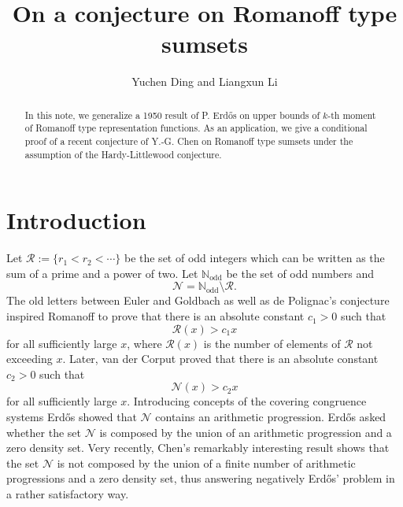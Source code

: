 \documentclass[12pt,a4paper,reqno]{amsart}
\numberwithin{equation}{section}
\theoremstyle{plain}
\theoremstyle{definition}
\begin{document}
\title
[On a conjecture on Romanoff type sumsets]
{On a conjecture on Romanoff type sumsets}

\author
[Y. Ding and L. Li] {Yuchen Ding and Liangxun Li}
\address{(Yuchen Ding$^{1,2}$) $^1$School of Mathematics,  Yangzhou University, Yangzhou 225002, People's Republic of China}
\address{$^2$HUN-REN Alfr\'ed R\'enyi Institute of Mathematics, Budapest, Pf. 127, H-1364 Hungary}


\address{(Liangxun Li$^{1,2}$) $^1$Mathematical Research Center, Shandong University, Jinan, Shandong 250100, People's Republic of China}
\address{$^2$HUN-REN Alfr\'ed R\'enyi Institute of Mathematics, Budapest, Pf. 127, H-1364 Hungary}





\begin{abstract}
In this note, we generalize a 1950 result of P. Erd\H os on upper bounds of $k$-th moment of Romanoff type representation functions. As an application, we give a conditional proof of a recent conjecture of Y.-G. Chen on Romanoff type sumsets under the assumption of the Hardy-Littlewood conjecture.
\end{abstract}
\maketitle

 
\section{Introduction}
Let 
$
\mathcal{R}:=\{r_1<r_2<\cdots\}
$
be the set of odd integers which can be written as the sum of a prime and a power of two. 
Let $\mathbb{N}_{\text{odd}}$ be the set of odd numbers and
$$
\mathcal{N}=\mathbb{N}_{\text{odd}}\setminus \mathcal{R}.
$$
The old letters between Euler and Goldbach \cite{Euler} as well as de Polignac's conjecture \cite{Polignac1,Polignac2} inspired Romanoff \cite{Romanoff} to prove that there is an absolute constant $c_1>0$ such that 
$$
\mathcal{R}(x)>c_1x
$$
for all sufficiently large $x$, where $\mathcal{R}(x)$ is the number of elements of $\mathcal{R}$ not exceeding $x$.
Later, van der Corput \cite{Corput} proved that there is an absolute constant $c_2>0$ such that
$$
\mathcal{N}(x)>c_2x
$$
for all sufficiently large $x$.
Introducing concepts of the covering congruence systems Erd\H os \cite{Erdos2} showed that $\mathcal{N}$ contains an arithmetic progression. Erd\H os \cite{Erdos-95} asked whether the set $\mathcal{N}$ is composed by the union of an arithmetic progression and a zero density set. Very recently, Chen's remarkably interesting result \cite{Chen2} shows that the set $\mathcal{N}$ is not composed by the union of a finite number of arithmetic progressions and a zero density set, thus answering negatively Erd\H os' problem in a rather satisfactory way.
\end{document}
